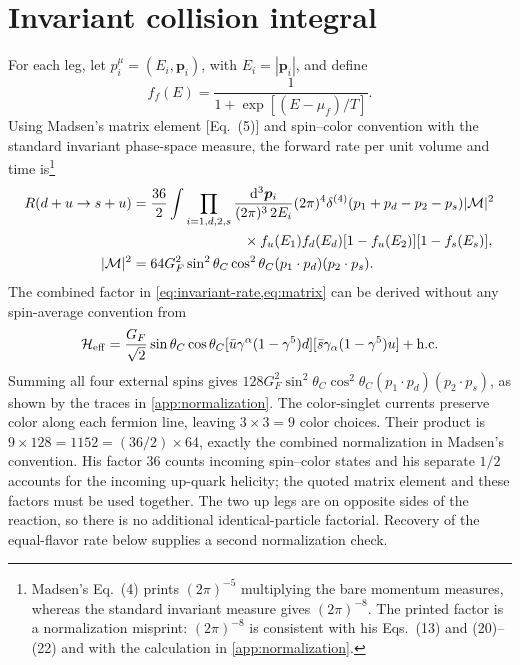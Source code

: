 \documentclass[11pt,letterpaper]{article}
\numberwithin{equation}{section}
\newcommand{\dd}{\mathrm d}
\begin{document}
\section{Invariant collision integral}
\label{sec:invariant}
For each leg, let \(p_i^\mu=(E_i,\bm p_i)\), with \(E_i=|\bm p_i|\), and define
\begin{equation}
 f_f(E)=\frac{1}{1+\exp[(E-\mu_f)/T]}.
 \label{eq:fermi}
\end{equation}
Using Madsen's matrix element [Eq.~(5)] and spin--color convention with the standard invariant phase-space measure, the forward rate per unit volume and time is\footnote{Madsen's Eq.~(4) prints \((2\pi)^{-5}\) multiplying the bare momentum measures, whereas the standard invariant measure gives \((2\pi)^{-8}\).
The printed factor is a normalization misprint: \((2\pi)^{-8}\) is consistent with his Eqs.~(13) and (20)--(22) and with the calculation in \cref{app:normalization}.}
\begin{align}
 R(d+u\to s+u)
 &=\frac{36}{2}\int\prod_{i=1,d,2,s}
 \frac{\dd^3\bm p_i}{(2\pi)^3\,2E_i}
 (2\pi)^4\delta^{(4)}(p_1+p_d-p_2-p_s)
 |\mathcal M|^2\notag\\
 &\hspace{28mm}\times f_u(E_1)f_d(E_d)
 [1-f_u(E_2)][1-f_s(E_s)],
 \label{eq:invariant-rate}\\
 |\mathcal M|^2
 &=64G_F^2\sin^2\theta_C\cos^2\theta_C
 (p_1\cdot p_d)(p_2\cdot p_s).
 \label{eq:matrix}
\end{align}
The combined factor in \cref{eq:invariant-rate,eq:matrix} can be derived without any spin-average convention from
\begin{equation}
 \mathcal H_{\rm eff}=\frac{G_F}{\sqrt2}\sin\theta_C\cos\theta_C
 [\bar u\gamma^\alpha(1-\gamma^5)d]
 [\bar s\gamma_\alpha(1-\gamma^5)u]+\text{h.c.}
 \label{eq:interaction}
\end{equation}
Summing all four external spins gives \(128G_F^2\sin^2\theta_C\cos^2\theta_C(p_1\cdot p_d)(p_2\cdot p_s)\), as shown by the traces in \cref{app:normalization}.
The color-singlet currents preserve color along each fermion line, leaving \(3\times3=9\) color choices.
Their product is \(9\times128=1152=(36/2)\times64\), exactly the combined normalization in Madsen's convention.
His factor \(36\) counts incoming spin--color states and his separate \(1/2\) accounts for the incoming up-quark helicity; the quoted matrix element and these factors must be used together.
The two up legs are on opposite sides of the reaction, so there is no additional identical-particle factorial.
Recovery of the equal-flavor rate below supplies a second normalization check.
\end{document}
